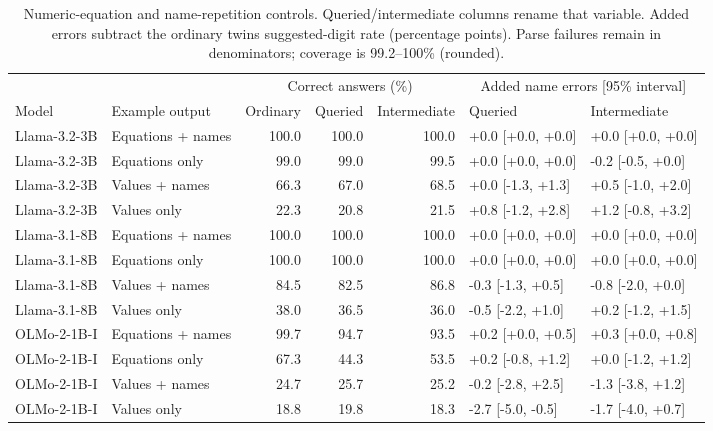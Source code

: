 \begin{table}[t]
\centering\small\setlength{\tabcolsep}{4pt}
\begin{tabular}{@{}llrrrll@{}}
\toprule
 & & \multicolumn{3}{c}{Correct answers (\%)} & \multicolumn{2}{c}{Added name errors [95\% interval]} \\
Model & Example output & Ordinary & Queried & Intermediate & Queried & Intermediate \\
\midrule
Llama-3.2-3B & Equations + names & 100.0 & 100.0 & 100.0 & +0.0 [+0.0, +0.0] & +0.0 [+0.0, +0.0] \\
Llama-3.2-3B & Equations only & 99.0 & 99.0 & 99.5 & +0.0 [+0.0, +0.0] & -0.2 [-0.5, +0.0] \\
Llama-3.2-3B & Values + names & 66.3 & 67.0 & 68.5 & +0.0 [-1.3, +1.3] & +0.5 [-1.0, +2.0] \\
Llama-3.2-3B & Values only & 22.3 & 20.8 & 21.5 & +0.8 [-1.2, +2.8] & +1.2 [-0.8, +3.2] \\
Llama-3.1-8B & Equations + names & 100.0 & 100.0 & 100.0 & +0.0 [+0.0, +0.0] & +0.0 [+0.0, +0.0] \\
Llama-3.1-8B & Equations only & 100.0 & 100.0 & 100.0 & +0.0 [+0.0, +0.0] & +0.0 [+0.0, +0.0] \\
Llama-3.1-8B & Values + names & 84.5 & 82.5 & 86.8 & -0.3 [-1.3, +0.5] & -0.8 [-2.0, +0.0] \\
Llama-3.1-8B & Values only & 38.0 & 36.5 & 36.0 & -0.5 [-2.2, +1.0] & +0.2 [-1.2, +1.5] \\
OLMo-2-1B-I & Equations + names & 99.7 & 94.7 & 93.5 & +0.2 [+0.0, +0.5] & +0.3 [+0.0, +0.8] \\
OLMo-2-1B-I & Equations only & 67.3 & 44.3 & 53.5 & +0.2 [-0.8, +1.2] & +0.0 [-1.2, +1.2] \\
OLMo-2-1B-I & Values + names & 24.7 & 25.7 & 25.2 & -0.2 [-2.8, +2.5] & -1.3 [-3.8, +1.2] \\
OLMo-2-1B-I & Values only & 18.8 & 19.8 & 18.3 & -2.7 [-5.0, -0.5] & -1.7 [-4.0, +0.7] \\
\bottomrule
\end{tabular}
\caption{Numeric-equation and name-repetition controls. Queried/intermediate columns rename that variable. Added errors subtract the ordinary twin\textquotesingle s suggested-digit rate (percentage points). Parse failures remain in denominators; coverage is 99.2--100\% (rounded).}
\label{tab:round7-formats}
\end{table}

